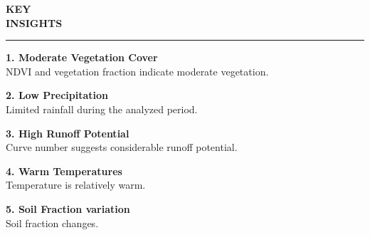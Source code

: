 \documentclass[12pt,a4paper]{article}
\newcommand{\HydroTitle}[1]{%
    {\titlefont\color{hydrosensblue}\bfseries\fontsize{60pt}{40pt}\selectfont #1}
}
\newcommand{\HydroContent}[1]{%
{\contentfont\color{black}\normalfont\fontsize{16pt}{20pt}\selectfont #1}
}
\begin{document}
\clearpage
\noindent
\begin{minipage}[t]{0.6\textwidth}

\HydroTitle{KEY\vspace{0.5cm}}\\ %
\HydroTitle{INSIGHTS}

  \vspace{0.5\baselineskip}
  \color{hydrosenscyan}\rule{0.25\textwidth}{3pt}
  \vspace{1\baselineskip}

  \raggedright
  \HydroContent{\textbf{1. Moderate Vegetation Cover}\\
  NDVI and vegetation fraction indicate moderate vegetation.}

  \vspace{0.6cm}
  \HydroContent{\textbf{2. Low Precipitation}\\
  Limited rainfall during the analyzed period.}

  \vspace{0.6cm}
  \HydroContent{\textbf{3. High Runoff Potential}\\
  Curve number suggests considerable runoff potential.}

  \vspace{0.6cm}
  \HydroContent{\textbf{4. Warm Temperatures}\\
  Temperature is relatively warm.}

  \vspace{0.6cm}
  \HydroContent{\textbf{5. Soil Fraction variation}\\
  Soil fraction changes.}

  \vspace{0.6cm}
\end{minipage}%
\hfill
\end{document}
